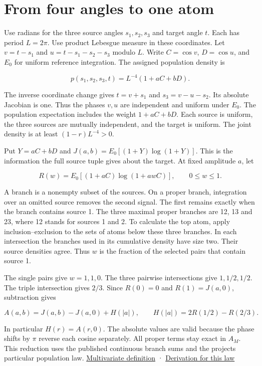 \clearpage

\section{From four angles to one atom}\label{from-four-angles-to-one-atom}

Use radians for the three source angles \(s_1,s_2,s_3\) and target angle \(t\). Each has period \(L=2\pi\). Use product Lebesgue measure in these coordinates. Let \(v=t-s_1\) and \(u=t-s_1-s_2-s_3\) modulo \(L\). Write \(C=\cos v\), \(D=\cos u\), and \(E_0\) for uniform reference integration. The assigned population density is

\[
p(s_1,s_2,s_3,t)= L^{-4}(1+aC+bD).
\]

The inverse coordinate change gives \(t=v+s_1\) and \(s_3=v-u-s_2\). Its absolute Jacobian is one. Thus the phases \(v,u\) are independent and uniform under \(E_0\). The population expectation includes the weight \(1+aC+bD\). Each source is uniform, the three sources are mutually independent, and the target is uniform. The joint density is at least \((1-r)L^{-4}>0\).

Put \(Y=aC+bD\) and \(J(a,b)=E_0[(1+Y)\log(1+Y)]\). This is the information the full source tuple gives about the target. At fixed amplitude \(a\), let

\[
R(w)=E_0[(1+aC)\log(1+awC)],\qquad 0\le w\le1 .
\]

A branch is a nonempty subset of the sources. On a proper branch, integration over an omitted source removes the second signal. The first remains exactly when the branch contains source 1. The three maximal proper branches are 12, 13 and 23, where 12 stands for sources 1 and 2. To calculate the top atom, apply inclusion--exclusion to the sets of atoms below these three branches. In each intersection the branches used in its cumulative density have size two. Their source densities agree. Thus \(w\) is the fraction of the selected pairs that contain source 1.

The single pairs give \(w=1,1,0\). The three pairwise intersections give \(1,1/2,1/2\). The triple intersection gives \(2/3\). Since \(R(0)=0\) and \(R(1)=J(a,0)\), subtraction gives

\[
A(a,b)=J(a,b)-J(a,0)+H(|a|),\qquad H(|a|)=2R(1/2)-R(2/3).
\]

In particular \(H(r)=A(r,0)\). The absolute values are valid because the phase shifts by \(\pi\) reverse each cosine separately. All proper terms stay exact in \(A_M\). This reduction uses the published continuous branch sums and the project\textquotesingle s particular population law. \href{https://arxiv.org/html/2311.06373v3\#S3.SS2}{Multivariate definition} · \href{https://github.com/sepahead/pid-rs/blob/main/audit/archive/angular-relative-bound-20261005/derivation.md.txt}{Derivation for this law}

